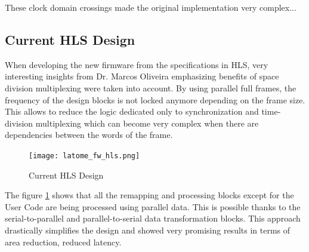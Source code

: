 These clock domain crossings made the original implementation very complex...

\subsection{Current HLS Design}\label{sec:current-hls-design}
When developing the new firmware from the specifications in HLS, very interesting insights from Dr. Marcos Oliveira emphasizing benefits of space division multiplexing were taken into account. By using parallel full frames, the frequency of the design blocks is not locked anymore depending on the frame size. This allows to reduce the logic dedicated only to synchronization and time-division multiplexing which can become very complex when there are dependencies between the words of the frame.

\begin{figure}
    \centering
    \texttt{[image: latome\_fw\_hls.png]}
    \caption{Current HLS Design}
    \label{fig:current-HLS-design}
\end{figure}

The figure \ref{fig:current-HLS-design} shows that all the remapping and processing blocks except for the User Code are being processed using parallel data. This is possible thanks to the serial-to-parallel and parallel-to-serial data transformation blocks. This approach drastically simplifies the design and showed very promising results in terms of area reduction, reduced latency.
